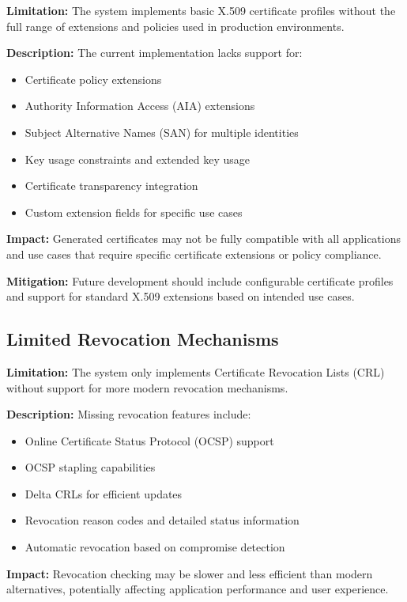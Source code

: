 \textbf{Limitation:} The system implements basic X.509 certificate profiles without the full range of extensions and policies used in production environments.

\textbf{Description:} The current implementation lacks support for:
\begin{itemize}
    \item Certificate policy extensions
    \item Authority Information Access (AIA) extensions
    \item Subject Alternative Names (SAN) for multiple identities
    \item Key usage constraints and extended key usage
    \item Certificate transparency integration
    \item Custom extension fields for specific use cases
\end{itemize}

\textbf{Impact:} Generated certificates may not be fully compatible with all applications and use cases that require specific certificate extensions or policy compliance.

\textbf{Mitigation:} Future development should include configurable certificate profiles and support for standard X.509 extensions based on intended use cases.

\subsection{Limited Revocation Mechanisms}

\textbf{Limitation:} The system only implements Certificate Revocation Lists (CRL) without support for more modern revocation mechanisms.

\textbf{Description:} Missing revocation features include:
\begin{itemize}
    \item Online Certificate Status Protocol (OCSP) support
    \item OCSP stapling capabilities
    \item Delta CRLs for efficient updates
    \item Revocation reason codes and detailed status information
    \item Automatic revocation based on compromise detection
\end{itemize}

\textbf{Impact:} Revocation checking may be slower and less efficient than modern alternatives, potentially affecting application performance and user experience.

